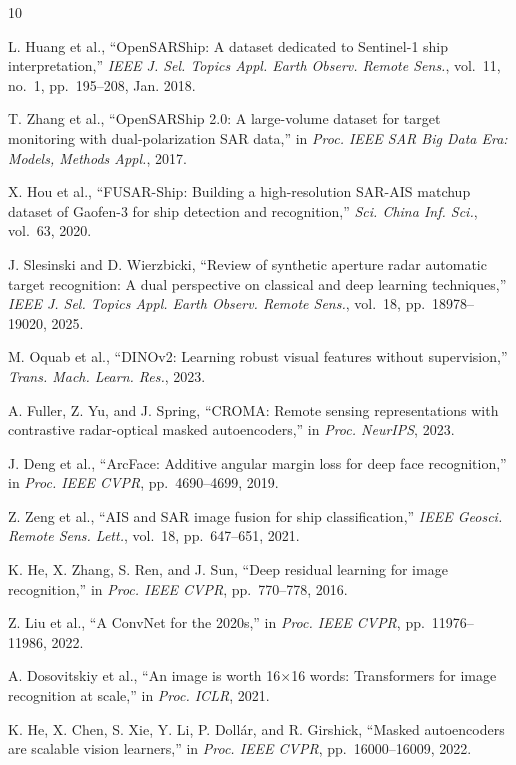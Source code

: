 \documentclass[journal]{IEEEtran}
\begin{document}
\begin{thebibliography}{10}

L. Huang et al., ``OpenSARShip: A dataset dedicated to Sentinel-1 ship
interpretation,'' \textit{IEEE J. Sel. Topics Appl. Earth Observ. Remote
Sens.}, vol.~11, no.~1, pp.~195--208, Jan. 2018.

T. Zhang et al., ``OpenSARShip 2.0: A large-volume dataset for target
monitoring with dual-polarization SAR data,'' in \textit{Proc. IEEE SAR
Big Data Era: Models, Methods Appl.}, 2017.

X. Hou et al., ``FUSAR-Ship: Building a high-resolution SAR-AIS matchup
dataset of Gaofen-3 for ship detection and recognition,''
\textit{Sci. China Inf. Sci.}, vol.~63, 2020.

J. Slesinski and D. Wierzbicki, ``Review of synthetic aperture radar
automatic target recognition: A dual perspective on classical and deep
learning techniques,'' \textit{IEEE J. Sel. Topics Appl. Earth Observ.
Remote Sens.}, vol.~18, pp.~18978--19020, 2025.

M. Oquab et al., ``DINOv2: Learning robust visual features without
supervision,'' \textit{Trans. Mach. Learn. Res.}, 2023.

A. Fuller, Z. Yu, and J. Spring, ``CROMA: Remote sensing representations
with contrastive radar-optical masked autoencoders,''
in \textit{Proc. NeurIPS}, 2023.

J. Deng et al., ``ArcFace: Additive angular margin loss for deep face
recognition,'' in \textit{Proc. IEEE CVPR}, pp.~4690--4699, 2019.

Z. Zeng et al., ``AIS and SAR image fusion for ship classification,''
\textit{IEEE Geosci. Remote Sens. Lett.}, vol.~18, pp.~647--651, 2021.

K. He, X. Zhang, S. Ren, and J. Sun, ``Deep residual learning for image
recognition,'' in \textit{Proc. IEEE CVPR}, pp.~770--778, 2016.

Z. Liu et al., ``A {ConvNet} for the 2020s,'' in \textit{Proc. IEEE CVPR},
pp.~11976--11986, 2022.

A. Dosovitskiy et al., ``An image is worth 16$\times$16 words: Transformers
for image recognition at scale,'' in \textit{Proc. ICLR}, 2021.

K. He, X. Chen, S. Xie, Y. Li, P. Doll{\'a}r, and R. Girshick, ``Masked
autoencoders are scalable vision learners,'' in \textit{Proc. IEEE CVPR},
pp.~16000--16009, 2022.


\end{thebibliography}
\end{document}

